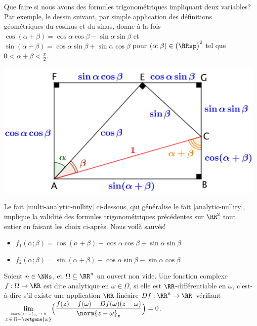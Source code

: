 Que faire si nous avons des formules trigonométriques impliquant deux variables? Par exemple, le dessin suivant, par simple application des définitions géométriques du cosinus et du sinus, donne à la fois
$\cos(\alpha + \beta) = \cos \alpha \cos \beta - \sin \alpha \sin \beta$
et
$\sin(\alpha + \beta) = \cos \alpha \sin \beta + \sin \alpha \cos \beta$
pour
$(\alpha ; \beta) \in \big( \RRsp \big)^2$ tel que $0 < \alpha + \beta < \frac{\pi}{2}$. 

\begin{center}
	\includegraphics[scale=.7]{two-var-trig-formulas.png}
\end{center}

Le fait \ref{multi-analytic-nullity} ci-dessous, qui généralise le fait \ref{analytic-nullity}, implique la validité des formules trigonométriques précédentes sur $\RR^2$ tout entier en faisant les choix ci-après.
Nous voilà sauvés!
%
\begin{itemize}[label=\small\textbullet]
	\item $f_1(\alpha ; \beta) = \cos(\alpha + \beta) - \cos \alpha \cos \beta + \sin \alpha \sin \beta$

	\item $f_2(\alpha ; \beta) = \sin(\alpha + \beta) - \cos \alpha \sin \beta - \sin \alpha \cos \beta$
\end{itemize}


\begin{defi}
    Soient $n \in \NNs$, et $\Omega \subseteq \RR^n$ un ouvert non vide.
	Une fonction complexe $f: \Omega \rightarrow \RR$ est dite analytique en $\omega \in \Omega$, 
	si elle est $\RR$-différentiable en $\omega$,
	c'est-à-dire s'il existe une application $\RR$-linéaire $Df: \RR^n \rightarrow \RR$
	vérifiant
	$\displaystyle \lim_{\stackrel{\norm{z - \omega}_n \, \rightarrow \, 0}{z \, \in \, \Omega - \setgene{\omega}}}\!\Big( \frac{f(z) - f(\omega) - Df(\omega) (z - \omega)}{\norm{z - \omega}_n} \Big) = 0$.
\end{defi}


